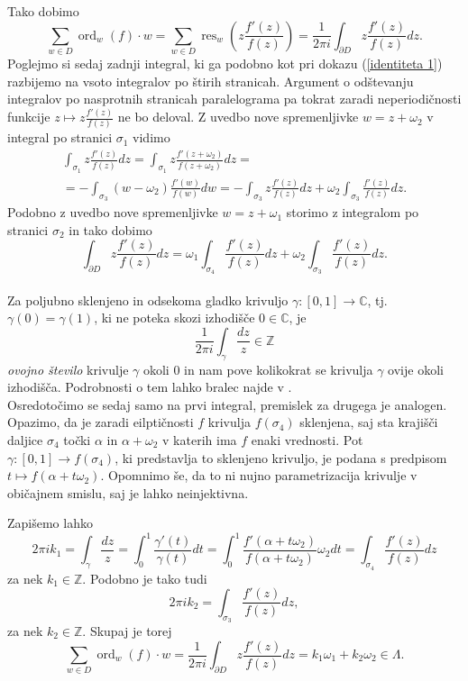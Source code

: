 \documentclass[mat1]{fmfdelo}
\newcommand{\Z}{\mathbb Z}
\newcommand{\C}{\mathbb C}
\newcommand{\res}[2]{\operatorname{res}_{#1}(#2)}
\newcommand{\ord}[2]{\operatorname{ord}_{#1}(#2)}
\theoremstyle{definition}
\begin{document}
\begin{dokaz}
\[        %
    \]
    Tako dobimo 
    \[
        \sum_{w \in D} \ord{w}{f}\cdot w 
        = \sum_{w \in D} \operatorname{res}_{w} \left( z \frac{f'(z)}{f(z)} \right)
        = \frac{1}{2 \pi i} \int_{\partial D} z \frac{f'(z)}{f(z)}dz. 
    \] 
    Poglejmo si sedaj zadnji integral, ki ga podobno kot pri dokazu (\ref{identiteta 1}) razbijemo na vsoto integralov po štirih stranicah. Argument o odštevanju integralov po nasprotnih stranicah paralelograma pa tokrat zaradi neperiodičnosti funkcije $z \mapsto z \frac{f'(z)}{f(z)}$ ne bo deloval. Z uvedbo nove spremenljivke $w = z + \omega_2$ v integral po stranici $\sigma_1$ vidimo
    \begin{multline*}
        \int_{\sigma_1} z \frac{f'(z)}{f(z)}dz = 
        \int_{\sigma_1} z \frac{f'(z + \omega_2)}{f(z + \omega_2)}dz = \\ = 
        - \int_{\sigma_3} (w - \omega_2) \frac{f'(w)}{f(w)}dw = 
        - \int_{\sigma_3} z \frac{f'(z)}{f(z)}dz + \omega_2 \int_{\sigma_3} \frac{f'(z)}{f(z)}dz.
    \end{multline*}
    Podobno z uvedbo nove spremenljivke $w = z + \omega_1$ storimo z integralom po stranici $\sigma_2$ in tako dobimo
    \[
        \int_{\partial D} z \frac{f'(z)}{f(z)}dz = \omega_1 \int_{\sigma_4} \frac{f'(z)}{f(z)}dz + \omega_2 \int_{\sigma_3} \frac{f'(z)}{f(z)}dz.
    \]
    \\

    Za poljubno sklenjeno in odsekoma gladko krivuljo $\gamma : [0,1] \to \C$, tj. $\gamma(0) = \gamma(1)$, ki ne poteka skozi izhodišče $0\in \C$, je
    \[
        \frac{1}{2 \pi i} \int_\gamma \frac{dz}{z} \in \Z
    \]
    \emph{ovojno število} krivulje $\gamma$ okoli $0$ in nam pove kolikokrat se krivulja $\gamma$ ovije okoli izhodišča. Podrobnosti o tem lahko bralec najde v \cite[4.2.1.]{Ahlfors}.
    \\

    Osredotočimo se sedaj samo na prvi integral, premislek za drugega je analogen. Opazimo, da je zaradi eilptičnosti $f$ krivulja $f(\sigma_4)$ sklenjena, saj sta krajišči daljice $\sigma_4$ točki $\alpha$ in $\alpha + \omega_2$ v katerih ima $f$ enaki vrednosti. Pot $\gamma : [0,1] \to f(\sigma_4)$, ki predstavlja to sklenjeno krivuljo, je podana s predpisom $t \mapsto f(\alpha + t\omega_2)$. Opomnimo še, da to ni nujno parametrizacija krivulje v običajnem smislu, saj je lahko neinjektivna. 
    
    Zapišemo lahko 
    \[
        2 \pi i k_1 = 
        \int_{\gamma} \frac{dz}{z} = 
        \int_0^1 \frac{\gamma'(t)}{\gamma(t)}dt =
        \int_0^1 \frac{f'(\alpha + t\omega_2)}{f(\alpha + t\omega_2)}\omega_2 dt = 
        \int_{\sigma_4} \frac{f'(z)}{f(z)}dz
    \]
    za nek $k_1 \in \Z$. Podobno je tako tudi
    \[
        2 \pi i k_2 = \int_{\sigma_3} \frac{f'(z)}{f(z)}dz,
    \]
    za nek $k_2 \in \Z$. Skupaj je torej 
    \[
        \sum_{w \in D} \ord{w}{f} \cdot w = 
        \frac{1}{2 \pi i} \int_{\partial D} z\frac{f'(z)}{f(z)}dz = 
        k_1 \omega_1 + k_2 \omega_2\in \Lambda.  
    \]
\end{dokaz}
\end{document}
